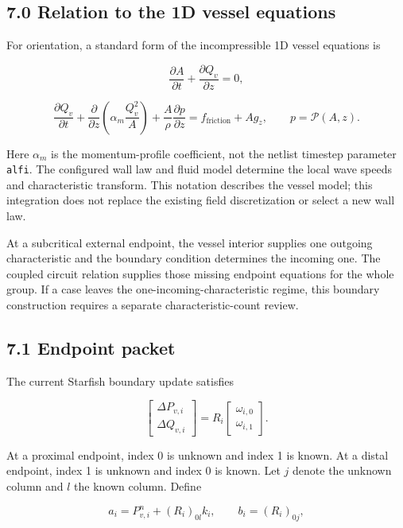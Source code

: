 \documentclass[11pt,a4paper]{article}
\begin{document}
\subsection{7.0 Relation to the 1D vessel equations}
For orientation, a standard form of the incompressible 1D vessel equations is


\nopagebreak[3]
\[
\frac{\partial A}{\partial t}+\frac{\partial Q_v}{\partial z}=0,
\]



\nopagebreak[3]
\[
\frac{\partial Q_v}{\partial t}
+\frac{\partial}{\partial z}\left(\alpha_m\frac{Q_v^2}{A}\right)
+\frac{A}{\rho}\frac{\partial p}{\partial z}
=f_{\mathrm{friction}}+Ag_z,
\qquad p=\mathcal{P}(A,z).
\]


Here \(\alpha_m\) is the momentum-profile coefficient, not the netlist timestep parameter \texttt{alfi}. The configured wall law and fluid model determine the local wave speeds and characteristic transform. This notation describes the vessel model; this integration does not replace the existing field discretization or select a new wall law.

At a subcritical external endpoint, the vessel interior supplies one outgoing characteristic and the boundary condition determines the incoming one. The coupled circuit relation supplies those missing endpoint equations for the whole group. If a case leaves the one-incoming-characteristic regime, this boundary construction requires a separate characteristic-count review.

\subsection{7.1 Endpoint packet}
The current Starfish boundary update satisfies


\nopagebreak[3]
\[
\begin{bmatrix}\Delta P_{v,i}\\\Delta Q_{v,i}\end{bmatrix}
=R_i\begin{bmatrix}\omega_{i,0}\\\omega_{i,1}\end{bmatrix}.
\]


At a proximal endpoint, index 0 is unknown and index 1 is known. At a distal endpoint, index 1 is unknown and index 0 is known. Let \(j\) denote the unknown column and \(l\) the known column. Define


\nopagebreak[3]
\[
a_i=P^n_{v,i}+(R_i)_{0l}k_i,\qquad b_i=(R_i)_{0j},
\]
\end{document}

